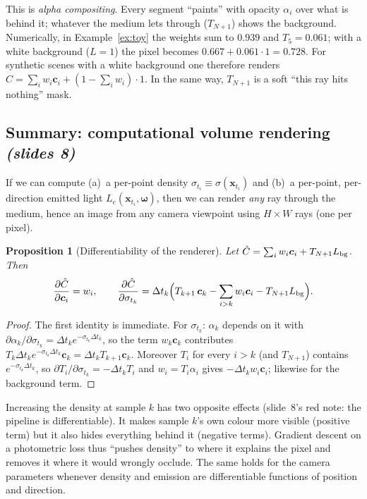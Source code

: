 \documentclass[11pt,a4paper]{article}
\newcommand{\xx}{\boldsymbol{x}}
\newcommand{\om}{\boldsymbol{\omega}}
\newcommand{\cc}{\boldsymbol{c}}
\newcommand{\Le}{L_e}
\newcommand{\sref}[1]{\texorpdfstring{\emph{(slides #1)}}{(slides #1)}}
\theoremstyle{definition}
\theoremstyle{plain}
\newtheorem{proposition}{Proposition}[section]
\begin{document}
\begin{intuition}
This is \emph{alpha compositing}. Every segment ``paints'' with opacity $\alpha_i$ over what is behind it; whatever the medium lets through ($T_{N+1}$) shows the background. Numerically, in Example~\ref{ex:toy} the weights sum to $0.939$ and $T_5=0.061$; with a white background ($L=1$) the pixel becomes $0.667+0.061\cdot 1=0.728$. For synthetic scenes with a white background one therefore renders $\hat C=\sum_iw_i\cc_i+(1-\sum_iw_i)\cdot 1$. In the same way, $T_{N+1}$ is a soft ``this ray hits nothing'' mask.
\end{intuition}

\subsection{Summary: computational volume rendering \sref{8}}

If we can compute (a)~a per-point density $\sigma_{t_i}\equiv\sigma(\xx_{t_i})$ and (b)~a per-point, per-direction emitted light $\Le(\xx_{t_i},\om)$, then we can render \emph{any} ray through the medium, hence an image from any camera viewpoint using $H\times W$ rays (one per pixel).

\begin{proposition}[Differentiability of the renderer]\label{prop:grad}
Let $\hat C=\sum_iw_i\cc_i+T_{N+1}L_{\rm bg}$. Then
\[
\frac{\partial\hat C}{\partial\cc_i}=w_i,\qquad
\frac{\partial\hat C}{\partial\sigma_{t_k}}=\Delta t_k\Big(T_{k+1}\,\cc_k-\sum_{i>k}w_i\cc_i-T_{N+1}L_{\rm bg}\Big).
\]
\end{proposition}
\begin{proof}
The first identity is immediate. For $\sigma_{t_k}$: $\alpha_k$ depends on it with $\partial\alpha_k/\partial\sigma_{t_k}=\Delta t_ke^{-\sigma_{t_k}\Delta t_k}$, so the term $w_k\cc_k$ contributes $T_k\Delta t_ke^{-\sigma_{t_k}\Delta t_k}\cc_k=\Delta t_kT_{k+1}\cc_k$. Moreover $T_i$ for every $i>k$ (and $T_{N+1}$) contains $e^{-\sigma_{t_k}\Delta t_k}$, so $\partial T_i/\partial\sigma_{t_k}=-\Delta t_kT_i$ and $w_i=T_i\alpha_i$ gives $-\Delta t_kw_i\cc_i$; likewise for the background term.
\end{proof}

\begin{intuition}
Increasing the density at sample $k$ has two opposite effects (slide~8's red note: the pipeline is differentiable). It makes sample $k$'s own colour more visible (positive term) but it also hides everything behind it (negative terms). Gradient descent on a photometric loss thus ``pushes density'' to where it explains the pixel and removes it where it would wrongly occlude. The same holds for the camera parameters whenever density and emission are differentiable functions of position and direction.
\end{intuition}
\end{document}

